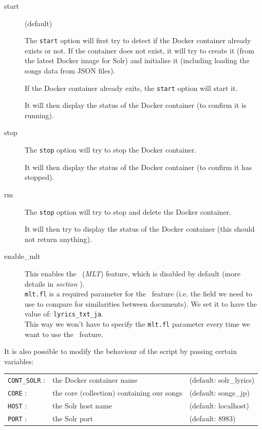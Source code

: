 \begin{description}
	\item[start] \hfill (default)
	
	The \texttt{start} option will first try to detect if the Docker container already exists or not. If the container does not exist, it will try to create it (from the latest Docker image for Solr) and initialise it (including loading the songs data from JSON files). 
	
	If the Docker container already exits, the \texttt{start} option will start it. 
	
	It will then display the status of the Docker container (to confirm it is running). 
	
	\item[stop] \hfill
	
	The \texttt{stop} option will try to stop the Docker container.
	
	It will then display the status of the Docker container (to confirm it has stopped). 
	
	\item[rm] \hfill
	
	The \texttt{stop} option will try to stop and delete the Docker container.
	
	It will then try to display the status of the Docker container (this should not return anything).
	
	
	\item[enable\_mlt] \hfill
	
	This enables the \MLT\ (\emph{MLT}) feature, which is disabled by default (more details in \emph{section }). \\
	
	\texttt{mlt.fl} is a required parameter for the \MLT\ feature (i.e. the field we need to use to compare for similarities between documents). 
	We set it to have the value of: \texttt{lyrics\_txt\_ja}.\\
	This way we won't have to specify the \texttt{mlt.fl} parameter every time we want to use the \MLT\ feature.
	
\end{description}


\bigskip

It is also possible to modify the behaviour of the script by passing certain variables: \\

\begin{tabular}{l l l}
	\texttt{CONT\_SOLR} : & the Docker container name & (default: solr\_lyrics) \\
	\texttt{CORE} : & the core (collection) containing our songs & (default: songs\_jp) \\
	\texttt{HOST} : & the Solr host name & (default: localhost) \\
	\texttt{PORT} : & the Solr port & (default: 8983) \\
\end{tabular}


